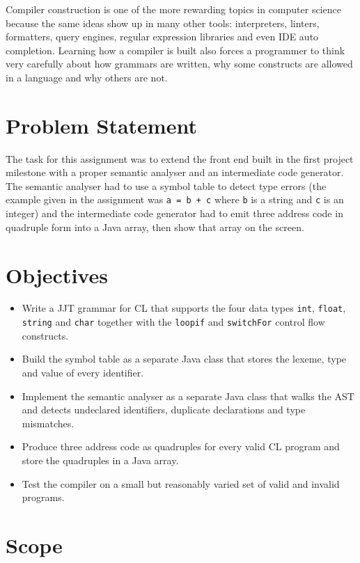 \documentclass[12pt,a4paper]{report}
\begin{document}
Compiler construction is one of the more rewarding topics in computer science because the same ideas show up in many other tools: interpreters, linters, formatters, query engines, regular expression libraries and even IDE auto completion. Learning how a compiler is built also forces a programmer to think very carefully about how grammars are written, why some constructs are allowed in a language and why others are not.

\section{Problem Statement}

The task for this assignment was to extend the front end built in the first project milestone with a proper semantic analyser and an intermediate code generator. The semantic analyser had to use a symbol table to detect type errors (the example given in the assignment was \texttt{a = b + c} where \texttt{b} is a string and \texttt{c} is an integer) and the intermediate code generator had to emit three address code in quadruple form into a Java array, then show that array on the screen.

\section{Objectives}

\begin{itemize}
\item Write a JJT grammar for CL that supports the four data types \texttt{int}, \texttt{float}, \texttt{string} and \texttt{char} together with the \texttt{loopif} and \texttt{switchFor} control flow constructs.
\item Build the symbol table as a separate Java class that stores the lexeme, type and value of every identifier.
\item Implement the semantic analyser as a separate Java class that walks the AST and detects undeclared identifiers, duplicate declarations and type mismatches.
\item Produce three address code as quadruples for every valid CL program and store the quadruples in a Java array.
\item Test the compiler on a small but reasonably varied set of valid and invalid programs.
\end{itemize}

\section{Scope}
\end{document}
